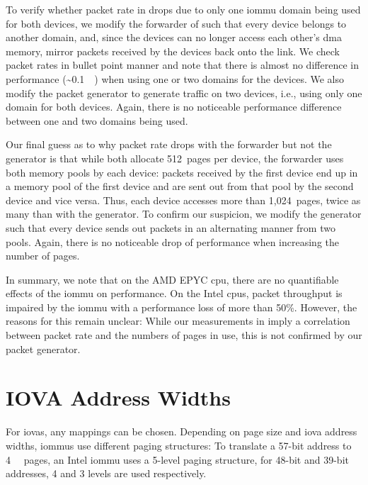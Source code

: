 To verify whether packet rate in  drops due to
only one \ac{iommu} domain being used for both devices, we modify the forwarder
of  such that every device belongs to another
domain, and, since the devices can no longer access each other's \ac{dma}
memory, mirror packets received by the devices back onto the link. We check
packet rates in bullet point manner and note that there is almost no difference
in performance (\textasciitilde \SI{0.1}{\mega\pps}) when using one or two
domains for the devices. We also modify the packet generator
 to generate traffic on two devices, i.e., using
only one domain for both devices. Again, there is no noticeable performance
difference between one and two domains being used.

Our final guess as to why packet rate drops with the forwarder but not the
generator is that while both allocate 512~pages per device, the forwarder uses
both memory pools by each device: packets received by the first device end up in
a memory pool of the first device and are sent out from that pool by the second
device and vice versa. Thus, each device accesses more than 1,024~pages, twice
as many than with the generator. To confirm our suspicion, we modify the
generator such that every device sends out packets in an alternating manner from
two pools. Again, there is no noticeable drop of performance when increasing the
number of pages.

In summary, we note that on the AMD EPYC \ac{cpu}, there are no quantifiable
effects of the \ac{iommu} on performance. On the Intel \acp{cpu}, packet
throughput is impaired by the \ac{iommu} with a performance loss of more than
50\%. However, the reasons for this remain unclear: While our measurements in
 imply a correlation between packet rate and the
numbers of pages in use, this is not confirmed by our packet generator.


\section{IOVA Address Widths}
\label{sec:iova_address_widths}

For \acp{iova}, any mappings can be chosen. Depending on page size and \ac{iova}
address widths, \acp{iommu} use different paging structures: To translate a
57-bit address to \SI{4}{\kibi\byte} pages, an Intel \ac{iommu} uses a 5-level
paging structure, for 48-bit and 39-bit addresses, 4 and 3 levels are used
respectively.

